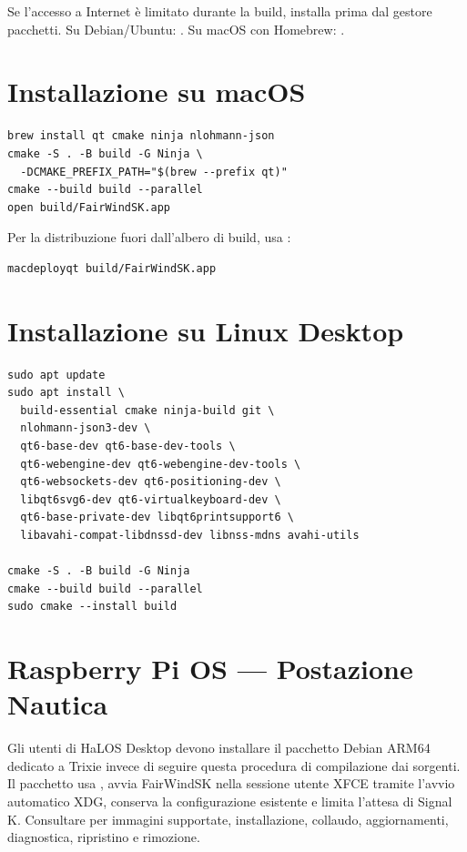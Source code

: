 \begin{tipbox}
Se l'accesso a Internet è limitato durante la build, installa prima
 dal gestore pacchetti.
Su Debian/Ubuntu: .
Su macOS con Homebrew: .
\end{tipbox}

\section{Installazione su macOS}
\label{app:macos}

\begin{lstlisting}
brew install qt cmake ninja nlohmann-json
cmake -S . -B build -G Ninja \
  -DCMAKE_PREFIX_PATH="$(brew --prefix qt)"
cmake --build build --parallel
open build/FairWindSK.app
\end{lstlisting}

Per la distribuzione fuori dall'albero di build, usa :

\begin{lstlisting}
macdeployqt build/FairWindSK.app
\end{lstlisting}

\section{Installazione su Linux Desktop}
\label{app:linux}

\begin{lstlisting}
sudo apt update
sudo apt install \
  build-essential cmake ninja-build git \
  nlohmann-json3-dev \
  qt6-base-dev qt6-base-dev-tools \
  qt6-webengine-dev qt6-webengine-dev-tools \
  qt6-websockets-dev qt6-positioning-dev \
  libqt6svg6-dev qt6-virtualkeyboard-dev \
  qt6-base-private-dev libqt6printsupport6 \
  libavahi-compat-libdnssd-dev libnss-mdns avahi-utils

cmake -S . -B build -G Ninja
cmake --build build --parallel
sudo cmake --install build
\end{lstlisting}

\section{Raspberry Pi OS --- Postazione Nautica}

Gli utenti di HaLOS Desktop devono installare il pacchetto Debian ARM64 dedicato a Trixie invece di seguire questa procedura di compilazione dai sorgenti. Il pacchetto usa , avvia FairWindSK nella sessione utente XFCE tramite l'avvio automatico XDG, conserva la configurazione esistente e limita l'attesa di Signal K. Consultare  per immagini supportate, installazione, collaudo, aggiornamenti, diagnostica, ripristino e rimozione.
\label{app:rpi-postazione}

